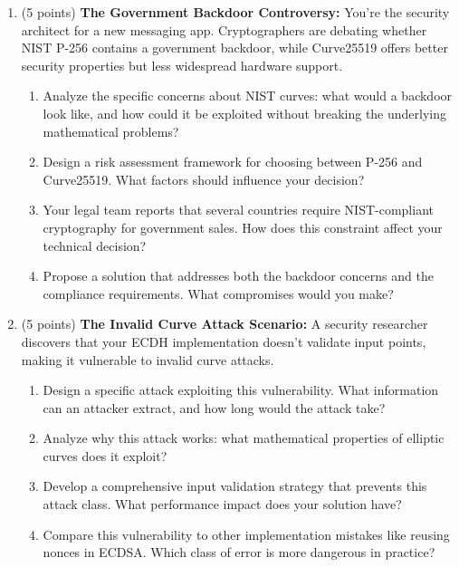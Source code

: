 \documentclass[10pt,a4paper,american]{exam}
\begin{document}
\begin{enumerate}
	\item (5 points) \textbf{The Government Backdoor Controversy:}
	      You're the security architect for a new messaging app. Cryptographers are debating whether NIST P-256 contains a government backdoor, while Curve25519 offers better security properties but less widespread hardware support.
	      \begin{enumerate}
		      \item Analyze the specific concerns about NIST curves: what would a backdoor look like, and how could it be exploited without breaking the underlying mathematical problems?
		      \item Design a risk assessment framework for choosing between P-256 and Curve25519. What factors should influence your decision?
		      \item Your legal team reports that several countries require NIST-compliant cryptography for government sales. How does this constraint affect your technical decision?
		      \item Propose a solution that addresses both the backdoor concerns and the compliance requirements. What compromises would you make?
	      \end{enumerate}

	\item (5 points) \textbf{The Invalid Curve Attack Scenario:}
	      A security researcher discovers that your ECDH implementation doesn't validate input points, making it vulnerable to invalid curve attacks.
	      \begin{enumerate}
		      \item Design a specific attack exploiting this vulnerability. What information can an attacker extract, and how long would the attack take?
		      \item Analyze why this attack works: what mathematical properties of elliptic curves does it exploit?
		      \item Develop a comprehensive input validation strategy that prevents this attack class. What performance impact does your solution have?
		      \item Compare this vulnerability to other implementation mistakes like reusing nonces in ECDSA. Which class of error is more dangerous in practice?
	      \end{enumerate}


\end{enumerate}
\end{document}
